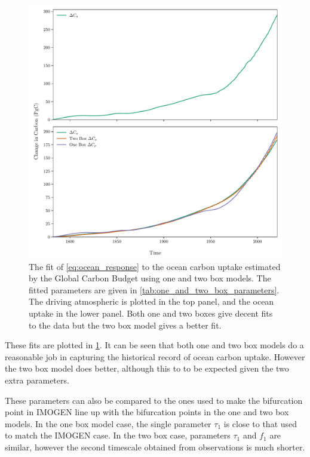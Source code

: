 \begin{figure}
  \centering
  \includegraphics[keepaspectratio,width=\textwidth]{gcb_ocean_atmosphere_boxes}
  \caption[One and two box fits to observations]{The fit of \cref{eq:ocean_response} to the ocean carbon uptake estimated by the Global Carbon Budget using one and
    two box models. The fitted parameters are given in
    \cref{tab:one_and_two_box_parameters}. The driving atmospheric  is plotted in the top panel, and the ocean uptake in the lower panel. Both one and two boxes give decent fits
    to the data but the two box model gives a better fit.}
  \label{fig:fits_from_one_and_two}
\end{figure}

These fits are plotted in \cref{fig:fits_from_one_and_two}. It can be seen that both one and two box models do a reasonable job in capturing the
historical record of ocean carbon uptake. However the two box model does better, although this to to be expected given the two extra parameters.

These parameters can also be compared to the ones used to make the bifurcation point in IMOGEN line up with the bifurcation points in the one and two box models. In the one box model case,
the single parameter $\tau_1$ is close to that used to match the IMOGEN case. In the two box case, parameters $\tau_1$ and $f_1$ are similar, however the second timescale obtained from observations
is much shorter.

